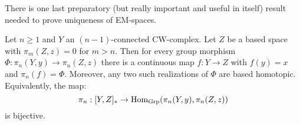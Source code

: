

There is one last preparatory (but really important and useful in itself) result needed to prove uniqueness of EM-spaces.

\begin{theorem}\label{theorem:correspondence-maps-and-group-morphisms}
Let $n\geq1$ and $Y$ an $(n-1)$-connected CW-complex. Let $Z$ be a based space with $\pi_m(Z,z)=0$ for $m>n$. Then for every group morphism $\Phi:\pi_n(Y,y)\to\pi_n(Z,z)$ there is a continuous map $f:Y\to Z$ with $f(y)=x$ and $\pi_n(f)=\Phi$. Moreover, any two such realizations of $\Phi$ are based homotopic. Equivalently, the map:
\[\pi_n:[Y,Z]_*\to\operatorname{Hom}_{\mathrm{Grp}}(\pi_n(Y,y),\pi_n(Z,z))\]
is bijective.
\end{theorem}

